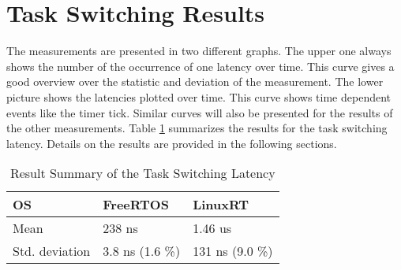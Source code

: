 \section{Task Switching Results}\label{s_task_switching_results}
The measurements are presented in two different graphs. 
The upper one always shows the number of the occurrence of one latency over time. 
This curve gives a good overview over the statistic and deviation of the measurement.
The lower picture shows the latencies plotted over time. 
This curve shows time dependent events like the timer tick.  
Similar curves will also be presented for the results of the other measurements.
Table \ref{tab_summary_task_switching} summarizes the results for the task switching latency.
Details on the results are provided in the following sections.

\begin{table}[htbp]
	\centering
		\begin{tabular}{|l||l|l|}
			\hline
				OS 											& FreeRTOS	& LinuxRT  \\
				\hline 
				Mean  										& 238 ns		& 1.46 us  \\
			  \hline
			  Std. deviation 	  & 3.8 ns (1.6 \%)		& 131 ns (9.0 \%)		  \\
			\hline
		\end{tabular}
	\caption{Result Summary of the Task Switching Latency}
	\label{tab_summary_task_switching}
\end{table}

